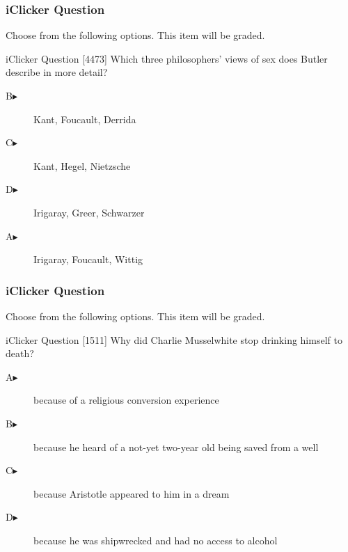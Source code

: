 \documentclass[xcolor=dvipsnames]{beamer}
\begin{document}
\begin{frame}
  \frametitle{iClicker Question}
Choose from the following options. This item will be graded.
\begin{block}{iClicker Question}
[4473] Which three philosophers' views of sex does Butler describe in more detail?
\end{block}
\begin{description}
\item[B\hspace{.2in}$\blacktriangleright$] Kant, Foucault, Derrida
\item[C\hspace{.2in}$\blacktriangleright$] Kant, Hegel, Nietzsche
\item[D\hspace{.2in}$\blacktriangleright$] Irigaray, Greer, Schwarzer
\item[A\hspace{.2in}$\blacktriangleright$] Irigaray, Foucault, Wittig
\end{description}
\end{frame}


\begin{frame}
  \frametitle{iClicker Question}
Choose from the following options. This item will be graded.
\begin{block}{iClicker Question}
[1511] Why did Charlie Musselwhite stop drinking himself to death?
\end{block}
\begin{description}
\item[A\hspace{.2in}$\blacktriangleright$] because of a religious
  conversion experience
\item[B\hspace{.2in}$\blacktriangleright$] because he heard of a
  not-yet two-year old being saved from a well
\item[C\hspace{.2in}$\blacktriangleright$] because Aristotle
  appeared to him in a dream
\item[D\hspace{.2in}$\blacktriangleright$] because he was shipwrecked
  and had no access to alcohol
\end{description}
\end{frame}
\end{document}
